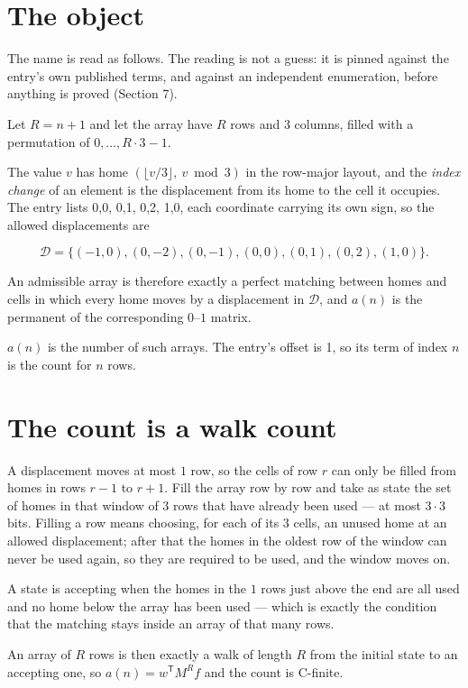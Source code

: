 \documentclass[11pt]{article}
\theoremstyle{definition}
\begin{document}
\section{The object}

The name is read as follows. The reading is not a guess: it is pinned against the entry's own published terms, and against an independent enumeration, before anything is proved (Section 7).

Let $R = n + 1$ and let the array have $R$ rows and $3$ columns, filled with a permutation of $0,\dots,R\cdot3-1$.

The value $v$ has home $(\lfloor v/3\rfloor,\ v \bmod 3)$ in the row-major layout, and the {\itshape index change} of an element is the displacement from its home to the cell it occupies. The entry lists 0,0, 0,1, 0,2, 1,0, each coordinate carrying its own sign, so the allowed displacements are

\[\mathcal{D} = \{(-1,0), (0,-2), (0,-1), (0,0), (0,1), (0,2), (1,0)\}.\]

An admissible array is therefore exactly a perfect matching between homes and cells in which every home moves by a displacement in $\mathcal{D}$, and $a(n)$ is the permanent of the corresponding $0$--$1$ matrix.

$a(n)$ is the number of such arrays. The entry's offset is 1, so its term of index $n$ is the count for $n$ rows.

\section{The count is a walk count}

A displacement moves at most $1$ row, so the cells of row $r$ can only be filled from homes in rows $r-1$ to $r+1$. Fill the array row by row and take as state the set of homes in that window of $3$ rows that have already been used --- at most $3\cdot3$ bits. Filling a row means choosing, for each of its $3$ cells, an unused home at an allowed displacement; after that the homes in the oldest row of the window can never be used again, so they are required to be used, and the window moves on.

A state is accepting when the homes in the $1$ rows just above the end are all used and no home below the array has been used --- which is exactly the condition that the matching stays inside an array of that many rows.

An array of $R$ rows is then exactly a walk of length $R$ from the initial state to an accepting one, so $a(n) = w^{\mathsf T}M^{R}f$ and the count is C-finite.
\end{document}
